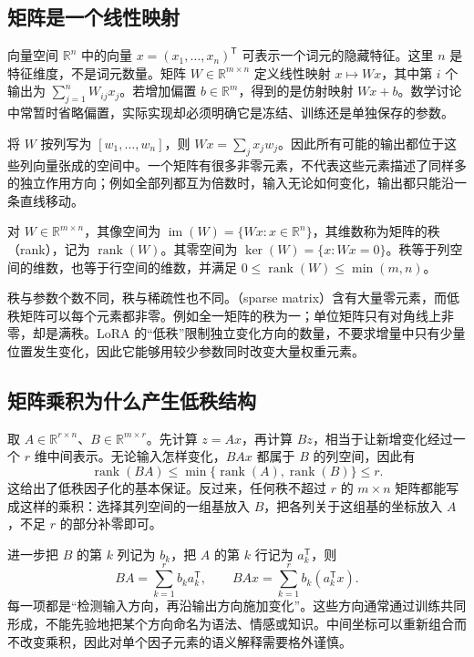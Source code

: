 \documentclass[UTF8,12pt,a4paper,fontset=fandol]{ctexart}
\begin{document}
\subsection{矩阵是一个线性映射}

向量空间 $\mathbb R^n$ 中的向量 $x=(x_1,\ldots,x_n)^{\mathsf T}$ 可表示一个词元的隐藏特征。这里 $n$ 是特征维度，不是词元数量。矩阵 $W\in\mathbb R^{m\times n}$ 定义线性映射 $x\mapsto Wx$，其中第 $i$ 个输出为 $\sum_{j=1}^{n}W_{ij}x_j$。若增加偏置 $b\in\mathbb R^m$，得到的是仿射映射 $Wx+b$。数学讨论中常暂时省略偏置，实际实现却必须明确它是冻结、训练还是单独保存的参数。

将 $W$ 按列写为 $[w_1,\ldots,w_n]$，则 $Wx=\sum_jx_jw_j$。因此所有可能的输出都位于这些列向量张成的空间中。一个矩阵有很多非零元素，不代表这些元素描述了同样多的独立作用方向；例如全部列都互为倍数时，输入无论如何变化，输出都只能沿一条直线移动。

\begin{definition}[秩、像空间与零空间]
对 $W\in\mathbb R^{m\times n}$，其像空间为
$\operatorname{im}(W)=\{Wx:x\in\mathbb R^n\}$，其维数称为矩阵的秩（rank），记为 $\operatorname{rank}(W)$。其零空间为
$\ker(W)=\{x:Wx=0\}$。秩等于列空间的维数，也等于行空间的维数，并满足
$0\leq\operatorname{rank}(W)\leq\min(m,n)$。
\end{definition}

秩与参数个数不同，秩与稀疏性也不同。（sparse matrix）含有大量零元素，而低秩矩阵可以每个元素都非零。例如全一矩阵的秩为一；单位矩阵只有对角线上非零，却是满秩。LoRA 的“低秩”限制独立变化方向的数量，不要求增量中只有少量位置发生变化，因此它能够用较少参数同时改变大量权重元素。

\subsection{矩阵乘积为什么产生低秩结构}

取 $A\in\mathbb R^{r\times n}$、$B\in\mathbb R^{m\times r}$。先计算 $z=Ax$，再计算 $Bz$，相当于让新增变化经过一个 $r$ 维中间表示。无论输入怎样变化，$BAx$ 都属于 $B$ 的列空间，因此有
\begin{equation}
\operatorname{rank}(BA)\leq
\min\{\operatorname{rank}(A),\operatorname{rank}(B)\}\leq r.
\label{eq:rank-product}
\end{equation}
这给出了低秩因子化的基本保证。反过来，任何秩不超过 $r$ 的 $m\times n$ 矩阵都能写成这样的乘积：选择其列空间的一组基放入 $B$，把各列关于这组基的坐标放入 $A$，不足 $r$ 的部分补零即可。

进一步把 $B$ 的第 $k$ 列记为 $b_k$，把 $A$ 的第 $k$ 行记为 $a_k^{\mathsf T}$，则
\begin{equation}
BA=\sum_{k=1}^{r}b_ka_k^{\mathsf T},
\qquad
BAx=\sum_{k=1}^{r}b_k(a_k^{\mathsf T}x).
\label{eq:outer-product}
\end{equation}
每一项都是“检测输入方向，再沿输出方向施加变化”。这些方向通常通过训练共同形成，不能先验地把某个方向命名为语法、情感或知识。中间坐标可以重新组合而不改变乘积，因此对单个因子元素的语义解释需要格外谨慎。
\end{document}

